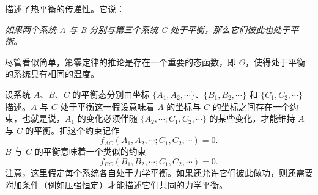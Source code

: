 
描述了热平衡的传递性。它说：

\emph{如果两个系统 A 与 B 分别与第三个系统 C 处于平衡，那么它们彼此也处于平衡。}

尽管看似简单，第零定律的推论是存在一个重要的态函数，即 $\Theta$，使得处于平衡的系统具有相同的温度。


设系统 $A$、$B$、$C$ 的平衡态分别由坐标 $\{A_1,A_2,\cdots\}$、$\{B_1,B_2,\cdots\}$ 和 $\{C_1,C_2,\cdots\}$ 描述。$A$ 与 $C$ 处于平衡这一假设意味着 $A$ 的坐标与 $C$ 的坐标之间存在一个约束，也就是说，$A_1$ 的变化必须伴随 $\{A_2,\cdots;C_1,C_2,\cdots\}$ 的某些变化，才能维持 $A$ 与 $C$ 的平衡。把这个约束记作
\begin{equation}
f_{AC}(A_1,A_2,\cdots;C_1,C_2,\cdots)=0.
\label{eq:1.1}
\end{equation}
$B$ 与 $C$ 的平衡意味着一个类似的约束
\begin{equation}
f_{BC}(B_1,B_2,\cdots;C_1,C_2,\cdots)=0.
\label{eq:1.2}
\end{equation}
注意，这里假定每个系统各自处于力学平衡。如果还允许它们彼此做功，则还需要附加条件（例如压强恒定）才能描述它们共同的力学平衡。

